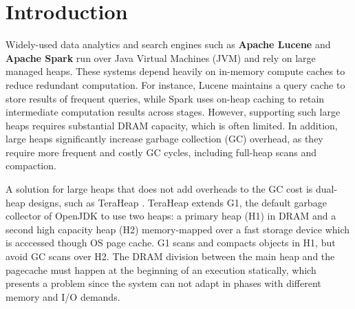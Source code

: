 \section{Introduction}



Widely-used data analytics and search engines such as \textbf{Apache Lucene}
\cite{klinaftakis2025thesis} and \textbf{Apache Spark} \cite{spark3.3} run over Java Virtual
Machines (JVM) and rely on large managed heaps. These systems depend heavily on in-memory compute caches
to reduce redundant computation. For instance, Lucene maintains a query cache to
store results of frequent queries, while Spark uses on-heap caching to retain
intermediate computation results across stages. However, supporting such large heaps
requires substantial DRAM capacity, which is often limited.
In addition, large heaps significantly increase garbage collection (GC) overhead,
as they require more frequent and costly GC cycles, including full-heap scans and compaction.

A solution for large heaps that does not add overheads to the GC cost is
dual-heap designs, such as TeraHeap \cite{teraheap_asplos}. TeraHeap extends
G1, the default garbage collector of OpenJDK to use two heaps: a primary heap
(H1) in DRAM and a second high capacity heap (H2) memory-mapped over a fast
storage device which is acccessed though OS page cache. G1 scans and compacts
objects in H1, but avoid GC scans over H2. The DRAM division between the main
heap and the pagecache must happen at the beginning of an execution statically,
which presents a problem since the system can not adapt in phases with
different memory and I/O demands.

